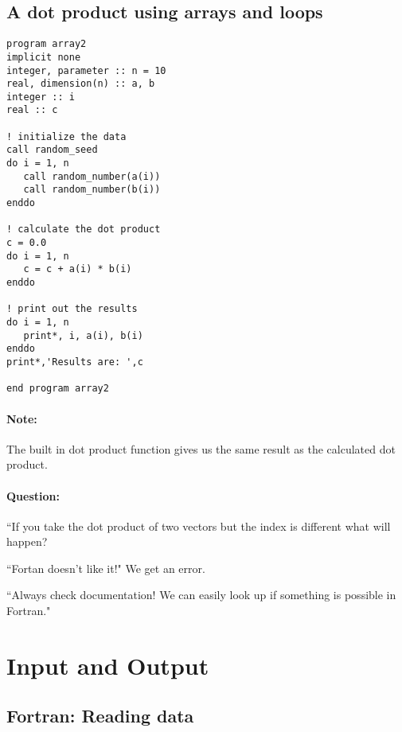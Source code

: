 \documentclass[11pt]{article}
\begin{document}
\subsection{A dot product using arrays and loops}
\noindent
\begin{minipage}[t]{0.5\textwidth}
\begin{lstlisting}
program array2
implicit none
integer, parameter :: n = 10
real, dimension(n) :: a, b
integer :: i
real :: c

! initialize the data
call random_seed
do i = 1, n
   call random_number(a(i))
   call random_number(b(i))
enddo

! calculate the dot product
c = 0.0
do i = 1, n
   c = c + a(i) * b(i)
enddo

! print out the results
do i = 1, n
   print*, i, a(i), b(i)
enddo
print*,'Results are: ',c

end program array2
\end{lstlisting}
	\end{minipage}	
\hfill
\begin{minipage}[t]{0.4\textwidth}
\paragraph{Note:}The built in dot product function gives us the same result as the calculated dot product.\\

\paragraph{Question:} ``If you take the dot product of two vectors but the index is different what will happen?\\

\par``Fortan doesn't like it!" We get an error.\\

\par ``Always check documentation! We can easily look up if something is possible in Fortran."
\end{minipage}

\section{Input and Output}
\subsection{Fortran: Reading data}
\end{document}

